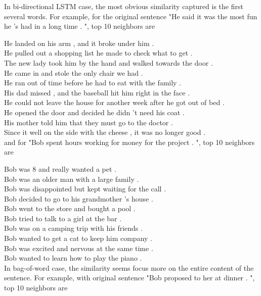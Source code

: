 \documentclass{article}
\begin{document}
In bi-directional LSTM case, the most obvious similarity captured is the first several words. For example, for the original sentence "He said it was the most fun he 's had in a long time . ", top 10 neighbors are 

He landed on his arm , and it broke under him .\\
He pulled out a shopping list he made to check what to get .\\
The new lady took him by the hand and walked towards the door .\\
He came in and stole the only chair we had .\\
He ran out of time before he had to eat with the family .\\
His dad missed , and the baseball hit him right in the face .\\
He could not leave the house for another week after he got out of bed .\\
He opened the door and decided he didn 't need his coat .\\
His mother told him that they must go to the doctor .\\
Since it well on the side with the cheese , it was no longer good .\\

and for "Bob spent hours working for money for the project . ", top 10 neighbors are 

Bob was 8 and really wanted a pet . \\
Bob was an older man with a large family . \\
Bob was disappointed but kept waiting for the call . \\
Bob decided to go to his grandmother 's house . \\
Bob went to the store and bought a pool . \\
Bob tried to talk to a girl at the bar . \\
Bob was on a camping trip with his friends . \\
Bob wanted to get a cat to keep him company . \\
Bob was excited and nervous at the same time . \\
Bob wanted to learn how to play the piano . \\

In bag-of-word case, the similarity seems focus more on the entire content of the sentence. For example, with original sentence "Bob proposed to her at dinner . ", top 10 neighbors are 
\end{document}

